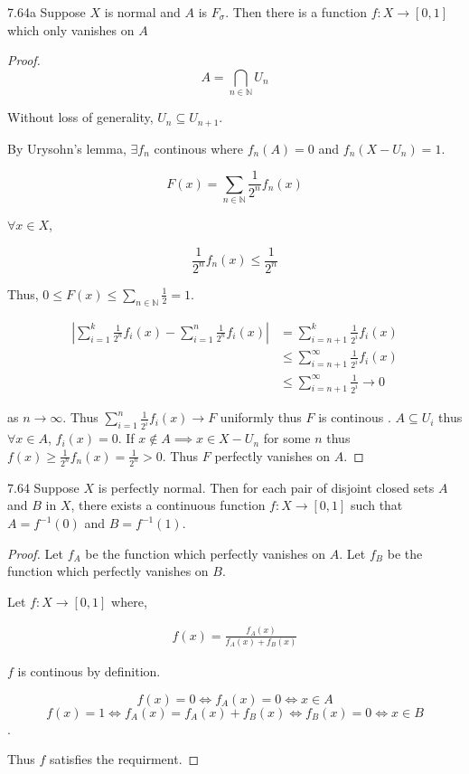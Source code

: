\documentclass{article}
\newcommand*{\subeq}{\subseteq}
\newcommand{\N}{\mathbb{N}}
\newcommand{\abs}[1]{\left\lvert #1\right\rvert}
\begin{document}
\begin{claim}{7.64a}\label{Claim 7.64a.}
    Suppose $X$ is normal and $A$ is $F_{\sigma}$. Then there is a function $f: X \to [0, 1]$ which only vanishes on $A$     
\end{claim} 
\begin{proof}
    \[
    A = \bigcap_{n \in \N} U_n
    \]

    Without loss of generality, $U_{n} \subeq U_{n + 1}$. 
    
    By Urysohn's lemma, $\exists f_n$ continous where $f_n(A) = 0$ and $f_n(X - U_n) = 1$. 
    
    \[F(x) = \sum_{n \in \N} \frac{1}{2^n} f_n(x)\]
    
    $\forall x \in X$, 
    
    \[\frac{1}{2^n}f_n(x) \leq \frac{1}{2^n}\]

    Thus, $0 \leq F(x) \leq \sum_{n \in \N} \frac{1}{2} = 1$. 
    
    \begin{align*}
        \abs{\sum_{i = 1}^{k}\frac{1}{2^n}f_i(x) - \sum_{i = 1}^{n}\frac{1}{2^n}f_i(x)} &= \sum_{i = n + 1}^{k}\frac{1}{2^i}f_i(x) \\
        &\leq \sum_{i = n + 1}^{\infty}\frac{1}{2^i}f_i(x)\\
        &\leq \sum_{i = n + 1}^{\infty}\frac{1}{2^i} \to 0
    \end{align*}

    as $n \to \infty$. Thus $\sum_{i = 1}^{n}\frac{1}{2^i}f_i(x) \to F$ uniformly thus $F$ is continous . $A \subeq U_i$ thus $\forall x \in A$, $f_i(x) = 0$. If $x \not \in A \implies x\in X - U_n$ for some $n$ thus $f(x) \geq \frac{1}{2^n}f_n(x) = \frac{1}{2^n} > 0$. Thus $F$ perfectly vanishes on $A$.              
\end{proof}


\begin{claim}{7.64}\label{Claim 7.64.}
    Suppose $X$ is perfectly normal. Then for each pair of disjoint closed sets $A$  and $B$ in $X$, there exists a continuous function $f: X \to [0, 1]$ such that $A = f^{-1}(0)$ and $B = f^{-1}(1)$.   
\end{claim} 
\begin{proof}
    Let $f_A$ be the function which perfectly vanishes on $A$. Let $f_B$ be the function which perfectly vanishes on $B$.

    Let $f : X \to [0, 1]$ where, 
    
    \begin{align*}
        f(x) = \frac{f_A(x)}{f_A(x) + f_B(x)}
    \end{align*}

    $f$ is continous by definition. 
    
    \[f(x) = 0 \iff f_A(x) = 0 \iff x \in A\]
    \[f(x) = 1 \iff f_A(x) = f_A(x) + f_B(x) \iff f_B(x) = 0 \iff x \in B\]. 

    Thus $f$ satisfies the requirment.     
\end{proof}
\end{document}
